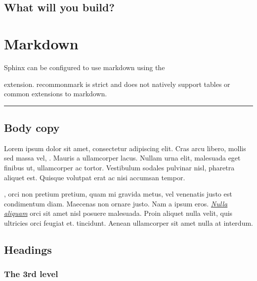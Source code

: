 \documentclass[letterpaper,10pt,english]{sphinxmanual}
\begin{document}
\section{What will you build?}
\label{\detokenize{markdown:what-will-you-build}}

\chapter{Markdown}
\label{\detokenize{markdown:markdown}}
Sphinx can be configured to use markdown using the %
\begin{footnote}[11]\sphinxAtStartFootnote
{}
%
\end{footnote}
extension. recommonmark is strict and does not natively support tables or common extensions
to markdown.


\bigskip\hrule\bigskip



\section{Body copy}
\label{\detokenize{markdown:body-copy}}
Lorem ipsum dolor sit amet, consectetur adipiscing elit. Cras arcu libero,
mollis sed massa vel, . Mauris a ullamcorper lacus. Nullam
urna elit, malesuada eget finibus ut, ullamcorper ac tortor. Vestibulum sodales
pulvinar nisl, pharetra aliquet est. Quisque volutpat erat ac nisi accumsan
tempor.

, orci non pretium pretium, quam mi gravida metus, vel
venenatis justo est condimentum diam. Maecenas non ornare justo. Nam a ipsum
eros. {\hyperref[\detokenize{markdown:}]{\emph{Nulla aliquam}}} orci sit amet nisl posuere malesuada. Proin aliquet
nulla velit, quis ultricies orci feugiat et. 
tincidunt. Aenean ullamcorper sit amet nulla at interdum.


\section{Headings}
\label{\detokenize{markdown:headings}}

\subsection{The 3rd level}
\label{\detokenize{markdown:the-3rd-level}}
\end{document}
